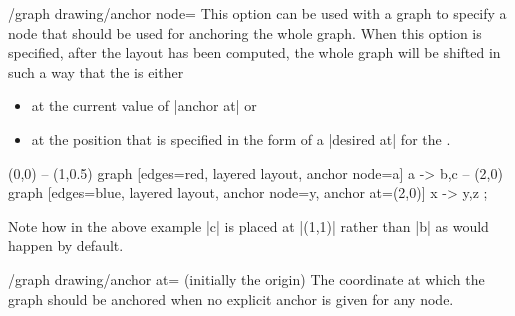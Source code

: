 \begin{key}{/graph drawing/anchor node=}
  This option can be used with a graph to specify a node that should
  be used for anchoring the whole graph. When this option is
  specified, after the layout has been computed, the whole graph will
  be shifted in such a way that the  is either
  \begin{itemize}
  \item at the current value of |anchor at| or 
  \item at the position that is specified in the form of a
    |desired at| for the .
  \end{itemize}
\begin{codeexample}[]
\tikz \draw (0,0)
  -- (1,0.5) graph [edges=red,  layered layout, anchor node=a] { a -> {b,c} }
  -- (2,0)   graph [edges=blue, layered layout,
                    anchor node=y, anchor at={(2,0)}]          { x -> {y,z} };
\end{codeexample}
\begin{codeexample}[]
\end{codeexample}
  Note how in the above example |c| is placed at |(1,1)| rather than
  |b| as would happen by default.
\end{key}

\begin{key}{/graph drawing/anchor at= (initially the origin)}
  The coordinate at which the graph should be anchored when no
  explicit anchor is given for any node.
\begin{codeexample}[]
\end{codeexample}
\end{key}

